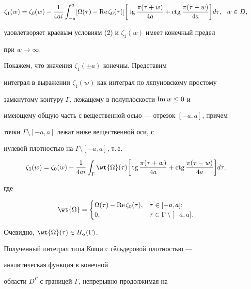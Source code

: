 \begin{pf}
$$


\zeta_1(w) = \zeta_0(w) - \frac{1}{4 a i} \int_{-a}^{a} [\Omega(\tau)


- \re \zeta_0(\tau)]\bigg[\tg\frac{\pi(\tau + w)}{4 a} + \ctg\frac{\pi


(\tau - w)}{4 a}\bigg]d\tau,\ \ w \in D,


$$


удовлетворяет краевым условиям (2) и $\zeta_1(w)$ имеет конечный предел


при $w \to \infty$.





Покажем, что значения $\zeta_1(\pm a)$ конечны. Представим


интеграл в выражении $\zeta_1(w)$ как интеграл по ляпуновскому простому


замкнутому контуру $\Gamma$, лежащему в полуплоскости $\operatorname{Im} w \leq 0$ и


имеющему общую часть с вещественной осью --- отрезок $[-a, a]$, причем


точки $\Gamma \setminus [-a,a]$ лежат ниже вещественной оси, с


нулевой плотностью на $\Gamma \setminus [-a,a]$, т.\,е.


$$


\zeta_1(w) = \zeta_0(w) - \frac{1}{4a i} \int_{\Gamma} \wt{\Omega}(\tau)


\bigg[\tg\frac{\pi(\tau + w)}{4 a} + \ctg\frac{\pi(\tau - w)}{4 a}


\bigg]d\tau,


$$


где


$$


\wt{\Omega} =


\begin{cases}


\Omega(\tau) - \re \zeta_0(\tau), & \tau \in [-a,a];\\


0, & \tau \in \Gamma \setminus [-a,a].


\end{cases}


$$


Очевидно, $\wt{\Omega}(\tau) \in H_{\alpha}(\Gamma)$.


Полученный интеграл типа Коши с г\"ельдеровой плотностью ---


аналитическая функция в конечной


области $D^{\Gamma}$ с границей $\Gamma$, непрерывно продолжимая на



\end{pf}
